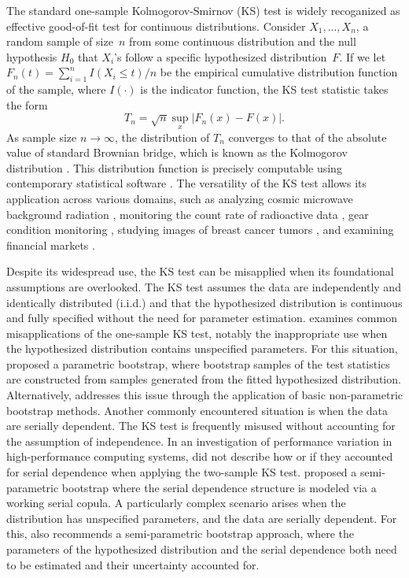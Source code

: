 \documentclass[12pt, titlepage, letterpaper]{article}
\begin{document}
{The standard one-sample Kolmogorov-Smirnov (KS) test is widely
recoganized as effective good-of-fit test for continuous distributions.
Consider $X_1, ..., X_n$, a random sample of size~$n$ from some continuous
distribution and the null hypothesis $H_0$ that $X_i$'s follow a specific
hypothesized distribution~$F$.
If we let $F_n(t) = \sum_{i=1}^n I(X_i \le t) / n$ be the empirical cumulative
distribution function of the sample, where $I(\cdot)$ is the indicator
function, the KS test statistic takes the form
\begin{equation}
  \label{eq:ks_standard}
  T_n = \sqrt{n} \sup_x | F_{n}(x) - F(x) |.
\end{equation}
As sample size $n\to \infty$, the distribution of $T_n$ converges to that of the
absolute value of standard Brownian bridge, which is known as the Kolmogorov
distribution \citep{stephens1974edf}. This distribution function is
precisely computable using contemporary statistical software
\citep{marsaglia2003evaluating}. The versatility of the KS test allows its
application across various domains, such as analyzing cosmic microwave
background radiation \citep{naess2012application}, monitoring the count rate of
radioactive data \citep{aslam2020introducing}, gear condition monitoring
\citep{andrade2001gear}, studying images of breast cancer tumors
\citep{demidenko2004kolmogorov}, and examining financial markets
\citep{lux2001turbulence}.


Despite its widespread use, the KS test can be 
misapplied when its foundational assumptions are overlooked. The KS test 
assumes the data are independently and identically distributed (i.i.d.) and 
that the hypothesized distribution is continuous and fully specified without 
the need for parameter estimation. \citet{zeimbekakis2022misuses} examines 
common misapplications of the one-sample KS test, notably the inappropriate
use when the hypothesized distribution contains unspecified parameters.
For this situation, \citet{zeimbekakis2022misuses} proposed a parametric
bootstrap, where bootstrap samples of the test statistics are constructed from
samples generated from the fitted hypothesized distribution.
Alternatively, \citet{babu2004goodness} addresses this issue through the
application of basic non-parametric bootstrap methods.
Another commonly encountered situation is when the data are serially
dependent. The KS test is frequently misused without accounting for the
assumption of independence. In an investigation of performance variation in
high-performance computing systems, \citet{tuncer2019ieee} did not describe
how or if they accounted for serial dependence when applying the two-sample
KS test.
\citet{zeimbekakis2022misuses} proposed a semi-parametric bootstrap
where the serial dependence structure is modeled via a working serial copula.
A particularly complex scenario arises when the distribution has unspecified
parameters, and the data are serially dependent. For this,
\citet{zeimbekakis2022misuses} also recommends a semi-parametric bootstrap
approach, where the parameters of the hypothesized distribution and the serial
dependence both need to be estimated and their uncertainty accounted for.


}
\end{document}
